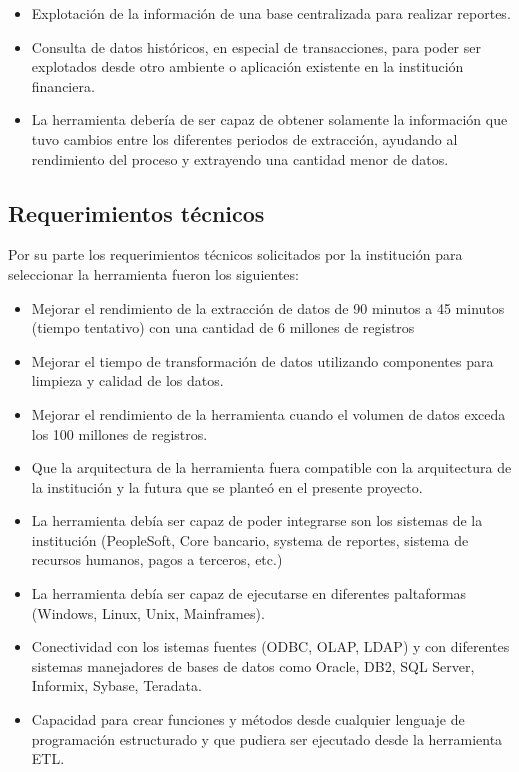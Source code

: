 \documentclass[a4paper,openright,12pt]{book}
\begin{document}
\begin{itemize}
\item Explotaci\'on de la informaci\'on de una base centralizada para realizar reportes.
\item Consulta de datos hist\'oricos, en especial de transacciones, para poder ser explotados desde otro ambiente o aplicaci\'on existente en la instituci\'on financiera.
\item La herramienta deber\'ia de ser capaz de obtener solamente la informaci\'on que tuvo cambios entre los diferentes periodos de extracci\'on, ayudando al rendimiento del proceso y extrayendo una cantidad menor de datos.
\end{itemize} 

\subsection{Requerimientos t\'ecnicos}

Por su parte los requerimientos t\'ecnicos solicitados por la instituci\'on para seleccionar la herramienta fueron los siguientes:

\begin{itemize}
\item Mejorar el rendimiento de la extracci\'on de datos de 90 minutos a 45 minutos (tiempo tentativo) con una cantidad de 6 millones de registros
\item Mejorar el tiempo de transformaci\'on de datos utilizando componentes para limpieza y calidad de los datos.
\item Mejorar el rendimiento de la herramienta cuando el volumen de datos exceda los 100 millones de registros.
\item Que la arquitectura de la herramienta fuera compatible con la arquitectura de la instituci\'on y la futura que se plante\'o en el presente proyecto.
\item La herramienta deb\'ia ser capaz de poder integrarse son los sistemas de la instituci\'on (PeopleSoft, Core bancario, systema de reportes, sistema de recursos humanos, pagos a terceros, etc.)
\item La herramienta deb\'ia ser capaz de ejecutarse en diferentes paltaformas (Windows, Linux, Unix, Mainframes).
\item Conectividad con los istemas fuentes (ODBC, OLAP, LDAP) y con diferentes sistemas manejadores de bases de datos como Oracle, DB2, SQL Server, Informix, Sybase, Teradata.
\item Capacidad para crear funciones y  m\'etodos desde cualquier lenguaje de programaci\'on estructurado y que pudiera ser ejecutado desde la herramienta ETL.
\end{itemize}
\end{document}
